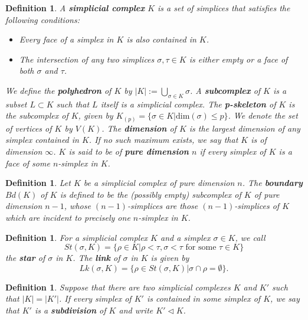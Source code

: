 \documentclass{scrreprt}
\newtheorem{definition}[prop]{Definition}
\begin{document}
\begin{definition}
A \textbf{simplicial complex} $K$ is a set of simplices that satisfies the following conditions:

\begin{itemize}
\item Every face of a simplex in $K$ is also contained in $K$.
\item The intersection of any two simplices $\sigma, \tau \in K$ is either empty or a face of both $\sigma$ and $\tau$.
\end{itemize}

We define the \textbf{polyhedron} of $K$ by $|K|:= \bigcup_{\sigma \in K} \sigma  $. A \textbf{subcomplex} of $K$ is a subset $L \subset K$ such that $L$ itself is a simplicial complex. The \textbf{p-skeleton} of $K$ is the subcomplex of $K$, given by $K_{(p)}= \{ \sigma \in  K | \text{dim}(\sigma) \leq p \}$. We denote the set of vertices of $K$ by $V(K)$. The \textbf{dimension} of $K$ is the largest dimension of any simplex contained in $K$. If no such maximum exists, we say that $K$ is of dimension $\infty$. $K$ is said to be of \textbf{pure dimension} $n$ if every simplex of $K$ is a face of some $n$-simplex in $K$.
\end{definition}


\begin{definition}
Let $K$ be a simplicial complex of pure dimension $n$. The \textbf{boundary} $Bd(K)$ of $K$ is defined to be the (possibly empty) subcomplex of $K$ of pure dimension $n-1$, whose $(n-1)$-simplices are those $(n-1)$-simplices of $K$ which are incident to precisely one $n$-simplex in $K$.
\end{definition}

\begin{definition}
For a simplicial complex $K$ and a simplex $\sigma \in K$, we call
\begin{equation*}
St(\sigma,K)= \{ \rho \in K | \rho < \tau, \sigma < \tau \text{ for some } \tau \in K \}  
\end{equation*}
the \textbf{star} of $\sigma$ in $K$. The \textbf{link} of $\sigma$ in $K$ is given by
\begin{equation*}
Lk(\sigma,K) = \{ \rho \in St(\sigma,K) | \sigma \cap \rho = \emptyset \}.
\end{equation*}
\end{definition}

\begin{definition}
Suppose that there are two simplicial complexes $K$ and $K'$ such that $|K| = |K'|$. If every simplex of $K'$ is contained in some simplex of $K$, we say that $K'$ is a \textbf{subdivision} of $K$ and write $K' \lhd K$.
\end{definition}
\end{document}
